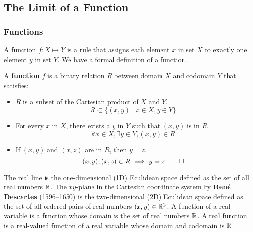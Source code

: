 \subsection{The Limit of a Function}

\subsubsection{Functions}
A function \(f:X\mapsto Y\) is a rule that assigns each element \(x\) in set
\(X\) to exactly one element \(y\) in set \(Y\).
We have a formal definition of a function.
\begin{definition}
    A \textbf{function} \(f\) is a binary relation \(R\) between domain \(X\)
    and codomain \(Y\) that satisfies:
    \begin{itemize}
        \item \(R\) is a subset of the Cartesian product of \(X\) and \(Y\).
        \[R\subset\{(x,y)\mid x\in X,y\in Y\}\]
        \item For every \(x\) in \(X\), there exists a \(y\) in \(Y\) such
        that \((x,y)\) is in \(R\).
        \[\forall x\in X,\exists y\in Y,(x,y)\in R\]
        \item If \((x,y)\) and \((x,z)\) are in \(R\), then \(y=z\).
        \[(x,y),(x,z)\in R\implies y=z\qedhere\]
    \end{itemize}
\end{definition}
The real line is the one-dimensional (1D) Eculidean space defined as the set
of all real numbers \(\mathbb{R}\).
The \(xy\)-plane in the Cartesian coordinate system by \textbf{René Descartes}
(1596--1650) is the two-dimensional (2D) Eculidean space defined as the set of
all ordered pairs of real numbers \((x,y)\in\mathbb{R}^2\).
A function of a real variable is a function whose domain is the set of real
numbers \(\mathbb{R}\).
A real function is a real-valued function of a real variable whose domain and
codomain is \(\mathbb{R}\).

